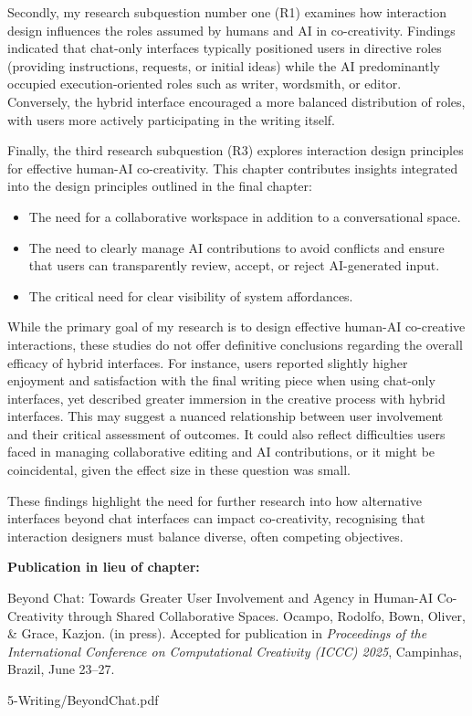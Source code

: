 Secondly, my research subquestion number one (R1) examines how interaction design influences the roles assumed by humans and AI in co-creativity. Findings indicated that chat-only interfaces typically positioned users in directive roles (providing instructions, requests, or initial ideas) while the AI predominantly occupied execution-oriented roles such as writer, wordsmith, or editor. Conversely, the hybrid interface encouraged a more balanced distribution of roles, with users more actively participating in the writing itself.

Finally, the third research subquestion (R3) explores interaction design principles for effective human-AI co-creativity. This chapter contributes insights integrated into the design principles outlined in the final chapter:

\begin{itemize}
    \item The need for a collaborative workspace in addition to a conversational space.
    \item The need to clearly manage AI contributions to avoid conflicts and ensure that users can transparently review, accept, or reject AI-generated input.
    \item The critical need for clear visibility of system affordances.
\end{itemize}

While the primary goal of my research is to design effective human-AI co-creative interactions, these studies do not offer definitive conclusions regarding the overall efficacy of hybrid interfaces. For instance, users reported slightly higher enjoyment and satisfaction with the final writing piece when using chat-only interfaces, yet described greater immersion in the creative process with hybrid interfaces. This may suggest a nuanced relationship between user involvement and their critical assessment of outcomes. It could also reflect difficulties users faced in managing collaborative editing and AI contributions, or it might be coincidental, given the effect size in these question was small.

These findings highlight the need for further research into how alternative interfaces beyond chat interfaces can impact co-creativity, recognising that interaction designers must balance diverse, often competing objectives.

\textbf{Publication in lieu of chapter:}

Beyond Chat: Towards Greater User Involvement and Agency in Human-AI Co-Creativity through Shared Collaborative Spaces. Ocampo, Rodolfo, Bown, Oliver, \& Grace, Kazjon. (in press). Accepted for publication in \textit{Proceedings of the International Conference on Computational Creativity (ICCC) 2025}, Campinhas, Brazil, June 23–27.


{5-Writing/BeyondChat.pdf}
